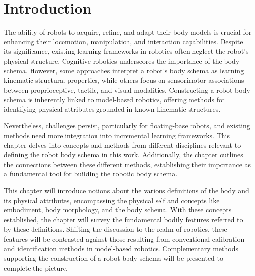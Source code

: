 \section{Introduction}
The ability of robots to acquire, refine, and adapt their body models is crucial for enhancing their locomotion, manipulation, and interaction capabilities. Despite its significance, existing learning frameworks in robotics often neglect the robot's physical structure. Cognitive robotics underscores the importance of the body schema. However, some approaches interpret a robot's body schema as learning kinematic structural properties, while others focus on sensorimotor associations between proprioceptive, tactile, and visual modalities. Constructing a robot body schema is inherently linked to model-based robotics, offering methods for identifying physical attributes grounded in known kinematic structures.

Nevertheless, challenges persist, particularly for floating-base robots, and existing methods need more integration into incremental learning frameworks. This chapter delves into concepts and methods from different disciplines relevant to defining the robot body schema in this work. Additionally, the chapter outlines the connections between these different methods, establishing their importance as a fundamental tool for building the robotic body schema.

This chapter will introduce notions about the various definitions of the body and its physical attributes, encompassing the physical self and concepts like embodiment, body morphology, and the body schema. With these concepts established, the chapter will survey the fundamental bodily features referred to by these definitions. Shifting the discussion to the realm of robotics, these features will be contrasted against those resulting from conventional calibration and identification methods in model-based robotics. Complementary methods supporting the construction of a robot body schema will be presented to complete the picture.


